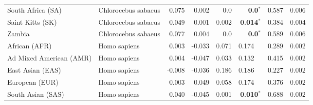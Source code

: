 \begin{center}
\begin{adjustbox}{width = 1\textwidth}
\begin{tabular}{|l|l|r|r|r|r|r|r|}
              South Africa (SA) &  Chlorocebus sabaeus &                                              0.075 &                                              0.002 &              0.0 &                    \textbf{0.0}$\bm{^*}$ &                                              0.587 &              0.006 \\
               Saint Kitts (SK) &  Chlorocebus sabaeus &                                              0.049 &                                              0.001 &            0.002 &                  \textbf{0.014}$\bm{^*}$ &                                              0.384 &              0.004 \\
                         Zambia &  Chlorocebus sabaeus &                                              0.077 &                                              0.004 &              0.0 &                    \textbf{0.0}$\bm{^*}$ &                                              0.589 &              0.006 \\
                  African (AFR) &         Homo sapiens &                                              0.003 &                                             -0.033 &            0.071 &                         0.174~~ &                                              0.289 &              0.002 \\
        Ad Mixed American (AMR) &         Homo sapiens &                                              0.004 &                                             -0.047 &            0.033 &                         0.132~~ &                                              0.415 &              0.002 \\
               East Asian (EAS) &         Homo sapiens &                                             -0.008 &                                             -0.036 &            0.186 &                         0.186~~ &                                              0.227 &              0.002 \\
                 European (EUR) &         Homo sapiens &                                             -0.003 &                                             -0.049 &            0.058 &                         0.174~~ &                                              0.376 &              0.002 \\
              South Asian (SAS) &         Homo sapiens &                                              0.040 &                                             -0.045 &            0.001 &                  \textbf{0.010}$\bm{^*}$ &                                              0.688 &              0.002 \\
\bottomrule
\end{tabular}
\end{adjustbox}
\newpage
\end{center}
